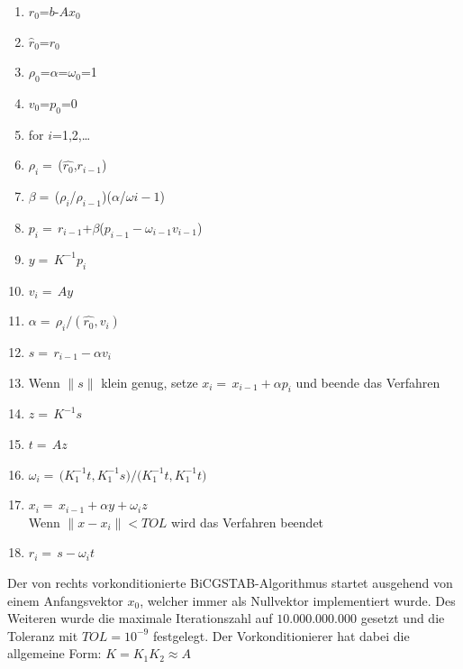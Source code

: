 \begin{enumerate}
	\setlength{\itemsep}{0cm}
	\setlength{\parsep}{0cm}
	
	
	\item $r_0$=$b$-$A$$x_0$\\
	\item $\hat{r}_0$=$r_0$\\
	\item $\rho_0$=$\alpha$=$\omega_0$=1\\
	\item $v_0$=$p_0$=0\\
	\item for $i$=1,2,\dots
	\par
	\begingroup
	\leftskip=1cm 
	\noindent 
	\item$\rho_i=$\,($\hat{r_0}$,$r_{i-1}$)\\
	\item$\beta=$\,($\rho_i$/$\rho_{i-1}$)($\alpha$/$\omega{i-1}$)\\
	\item$p_i=$\,$r_{i-1}$+$\beta$($p_{i-1}-\omega_{i-1}v_{i-1}$)	\\
	\item$y=$\,$K^{-1}p_i$\\
	\item$v_i=$\,$Ay$\\
	\item$\alpha=$\,$\rho_i/(\hat{r_0},v_i)$\\
	\item$s=$\,$r_{i-1}-\alpha$$v_i$\\
	\item Wenn $\parallel s \parallel$ klein genug, setze $x_i=$\,$x_{i-1}+\alpha$$p_i$ und beende das Verfahren \\
	\item$z=$\,$K^{-1}s$\\
	\item$t=$\,$Az$\\
	\item$\omega_i=$\,$(K^{-1}_1$$t,K^{-1}_1$$s)/(K^{-1}_1$$t,K^{-1}_1$$t)$ \\
	\item$x_i=$\,$x_{i-1}+\alpha$$y+\omega_i$$z$\\
	Wenn $\parallel x-x_i \parallel < TOL $ wird das Verfahren beendet \\
	\item$r_i=$\,$s-\omega_i$$t$\\
	
	
	\par
	\endgroup 
\end{enumerate}
Der von rechts vorkonditionierte BiCGSTAB-Algorithmus startet ausgehend von einem Anfangsvektor $x_0$, welcher immer als Nullvektor implementiert wurde. Des Weiteren wurde die maximale Iterationszahl auf $10.000.000.000$ gesetzt und die Toleranz mit $TOL= 10^{-9}$ festgelegt. Der Vorkonditionierer hat dabei die allgemeine Form: 
$K = K_1 K_2 \approx A $

